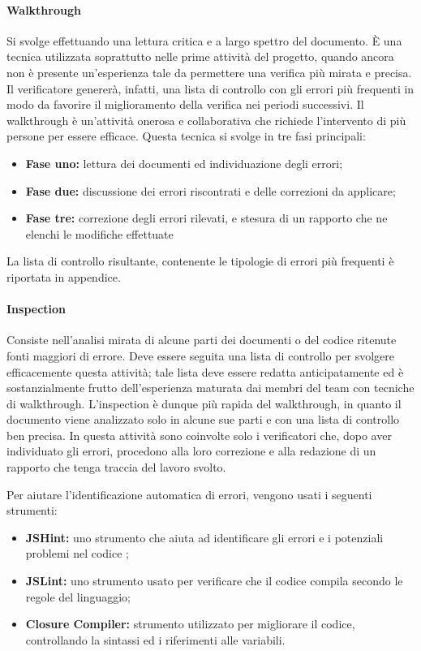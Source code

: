     \paragraph{Walkthrough}
    Si svolge effettuando una lettura critica e a largo spettro del documento.
È una tecnica utilizzata soprattutto nelle prime attività del progetto, quando ancora
non è presente un'esperienza tale da permettere una verifica più mirata e precisa.
Il verificatore genererà, infatti, una lista di controllo con gli errori più frequenti
in modo da favorire il miglioramento della verifica nei periodi successivi.
Il walkthrough è un'attività onerosa e collaborativa che richiede l'intervento di
più persone per essere efficace. Questa tecnica si svolge in tre fasi principali:
\begin{itemize}
\item \textbf{Fase uno:} lettura dei documenti ed individuazione degli errori;
\item \textbf{Fase due:} discussione dei errori riscontrati e delle correzioni da applicare;
\item \textbf{Fase tre:} correzione degli errori rilevati, e stesura di un rapporto che ne elenchi le modifiche effettuate
\end{itemize}

La lista di controllo risultante, contenente le tipologie di errori più frequenti è riportata in appendice.

    \paragraph{Inspection}
	Consiste nell'analisi mirata di alcune parti dei documenti o del codice ritenute fonti maggiori di errore. Deve essere seguita una lista di controllo per svolgere efficacemente questa attività; tale lista deve essere redatta anticipatamente ed è sostanzialmente frutto dell'esperienza maturata dai membri del team con tecniche di walkthrough.
L'inspection è dunque più rapida del walkthrough, in quanto il documento viene
analizzato solo in alcune sue parti e con una lista di controllo ben precisa. In questa
attività sono coinvolte solo i verificatori che, dopo aver individuato gli errori, procedono
alla loro correzione e alla redazione di un rapporto che tenga traccia del lavoro svolto.


Per aiutare l'identificazione automatica di errori, vengono usati i seguenti strumenti:
\begin{itemize}
\item \textbf{JSHint: }uno strumento che aiuta ad identificare gli errori e i potenziali problemi nel codice ;
\item \textbf{JSLint: }uno strumento usato per verificare che il codice  compila secondo le regole del linguaggio;
\item \textbf{Closure Compiler: }strumento utilizzato per  migliorare il codice, controllando la sintassi ed i riferimenti alle variabili.
\end{itemize}

